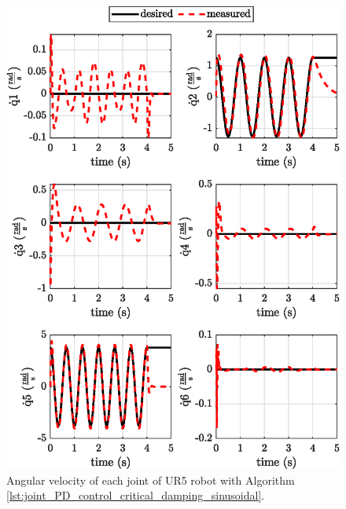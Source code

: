 \begin{figure}[H]
    \centering
    \includegraphics{images/act_1.5_sin/joint_velocity.eps}
    \caption{Angular velocity of each joint of UR5 robot with Algorithm \ref{lst:joint_PD_control_critical_damping_sinusoidal}.}
    \label{fig:act_1.5_sin_joint_velocity}
\end{figure}


